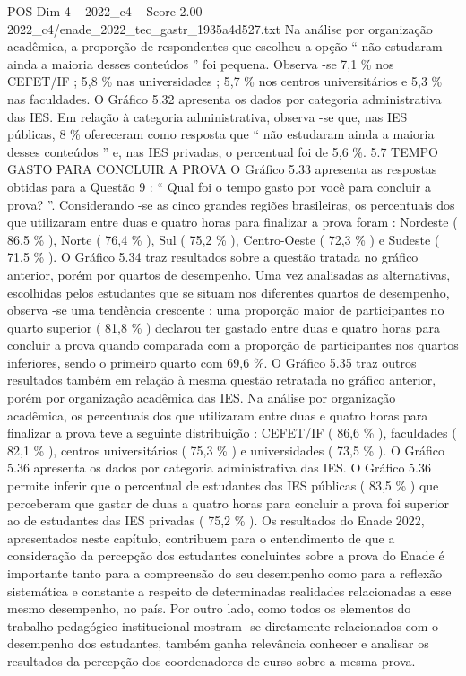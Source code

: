 \begin{textsample}{POS Dim 4 – 2022\_c4 – Score 2.00 – 2022\_c4/enade\_2022\_tec\_gastr\_1935a4d527.txt}
Na análise por organização acadêmica, a proporção de respondentes que escolheu a opção “ não estudaram ainda a maioria desses conteúdos ” foi pequena.
Observa -se 7,1 \% nos CEFET/IF ; 5,8 \% nas universidades ; 5,7 \% nos centros universitários e 5,3 \% nas faculdades.
O Gráfico 5.32 apresenta os dados por categoria administrativa das IES.
Em relação à categoria administrativa, observa -se que, nas IES públicas, 8 \% ofereceram como resposta que “ não estudaram ainda a maioria desses conteúdos ” e, nas IES privadas, o percentual foi de 5,6 \%. 5.7 TEMPO GASTO PARA CONCLUIR A PROVA O Gráfico 5.33 apresenta as respostas obtidas para a Questão 9 : “ Qual foi o tempo gasto por você para concluir a prova? ”.
Considerando -se as cinco grandes regiões brasileiras, os percentuais dos que utilizaram entre duas e quatro horas para finalizar a prova foram : Nordeste ( 86,5 \% ), Norte ( 76,4 \% ), Sul ( 75,2 \% ), Centro-Oeste ( 72,3 \% ) e Sudeste ( 71,5 \% ).
O Gráfico 5.34 traz resultados sobre a questão tratada no gráfico anterior, porém por quartos de desempenho.
Uma vez analisadas as alternativas, escolhidas pelos estudantes que se situam nos diferentes quartos de desempenho, observa -se uma tendência crescente : uma proporção maior de participantes no quarto superior ( 81,8 \% ) declarou ter gastado entre duas e quatro horas para concluir a prova quando comparada com a proporção de participantes nos quartos inferiores, sendo o primeiro quarto com 69,6 \%.
O Gráfico 5.35 traz outros resultados também em relação à mesma questão retratada no gráfico anterior, porém por organização acadêmica das IES.
Na análise por organização acadêmica, os percentuais dos que utilizaram entre duas e quatro horas para finalizar a prova teve a seguinte distribuição : CEFET/IF ( 86,6 \% ), faculdades ( 82,1 \% ), centros universitários ( 75,3 \% ) e universidades ( 73,5 \% ).
O Gráfico 5.36 apresenta os dados por categoria administrativa das IES.
O Gráfico 5.36 permite inferir que o percentual de estudantes das IES públicas ( 83,5 \% ) que perceberam que gastar de duas a quatro horas para concluir a prova foi superior ao de estudantes das IES privadas ( 75,2 \% ).
Os resultados do Enade 2022, apresentados neste capítulo, contribuem para o entendimento de que a consideração da percepção dos estudantes concluintes sobre a prova do Enade é importante tanto para a compreensão do seu desempenho como para a reflexão sistemática e constante a respeito de determinadas realidades relacionadas a esse mesmo desempenho, no país.
Por outro lado, como todos os elementos do trabalho pedagógico institucional mostram -se diretamente relacionados com o desempenho dos estudantes, também ganha relevância conhecer e analisar os resultados da percepção dos coordenadores de curso sobre a mesma prova.

\end{textsample}
